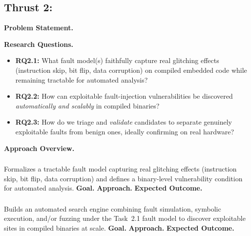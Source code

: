 \subsection{Thrust 2: \thrusttwo}
\label{sec:thrust2}

\noindent\textbf{Problem Statement.}

\smallskip
\noindent\textbf{Research Questions.}
\begin{itemize}[leftmargin=*,nosep]
  \item \textbf{RQ2.1:} What fault model(s) faithfully capture real glitching effects (instruction skip, bit flip, data corruption) on compiled embedded code while remaining tractable for automated analysis?
  \item \textbf{RQ2.2:} How can exploitable fault-injection vulnerabilities be discovered \emph{automatically and scalably} in compiled binaries?
  \item \textbf{RQ2.3:} How do we triage and \emph{validate} candidates to separate genuinely exploitable faults from benign ones, ideally confirming on real hardware?
\end{itemize}

\smallskip
\noindent\textbf{Approach Overview.}

\subsubsection{\researchtwoone}
Formalizes a tractable fault model capturing real glitching effects (instruction skip, bit flip, data corruption) and defines a binary-level vulnerability condition for automated analysis.
\noindent\textbf{Goal.} %
\noindent\textbf{Approach.} %
\noindent\textbf{Expected Outcome.} %

\subsubsection{\researchtwotwo}
Builds an automated search engine combining fault simulation, symbolic execution, and/or fuzzing under the Task~2.1 fault model to discover exploitable sites in compiled binaries at scale.
\noindent\textbf{Goal.} %
\noindent\textbf{Approach.} %
\noindent\textbf{Expected Outcome.} %

